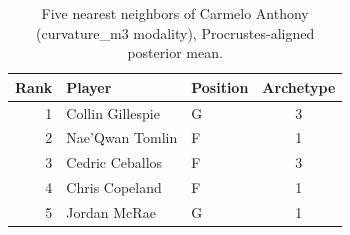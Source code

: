 \begin{table}[htbp]
  \centering\small
  \begin{tabular}{rllc}
    \toprule
    Rank & Player & Position & Archetype \\
    \midrule
    1 & Collin Gillespie & G & 3 \\
    2 & Nae'Qwan Tomlin & F & 1 \\
    3 & Cedric Ceballos & F & 3 \\
    4 & Chris Copeland & F & 1 \\
    5 & Jordan McRae & G & 1 \\
    \bottomrule
  \end{tabular}
  \caption{Five nearest neighbors of Carmelo Anthony (curvature_m3 modality), Procrustes-aligned posterior mean.}
  \label{tab:Carmelo_Anthony_neighbors_curvature_m3}
\end{table}


